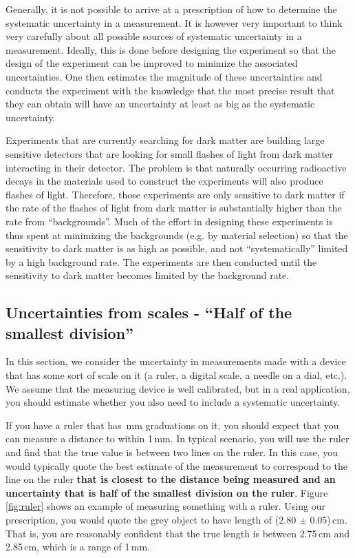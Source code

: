 Generally, it is not possible to arrive at a prescription of how to determine the systematic uncertainty in a measurement. It is however very important to think very carefully about all possible sources of systematic uncertainty in a measurement. Ideally, this is done before designing the experiment so that the design of the experiment can be improved to minimize the associated uncertainties. One then estimates the magnitude of these uncertainties and conducts the experiment with the knowledge that the most precise result that they can obtain will have an uncertainty at least as big as the systematic uncertainty.

Experiments that are currently searching for dark matter are building large sensitive detectors that are looking for small flashes of light from dark matter interacting in their detector. The problem is that naturally occurring radioactive decays in the materials used to construct the experiments will also produce flashes of light. Therefore, those experiments are only sensitive to dark matter if the rate of the flashes of light from dark matter is substantially higher than the rate from ``backgrounds''. Much of the effort in designing these experiments is thus spent at minimizing the backgrounds (e.g. by material selection) so that the sensitivity to dark matter is as high as possible, and not ``systematically'' limited by a high background rate. The experiments are then conducted until the sensitivity to dark matter becomes limited by the background rate.


\subsection{Uncertainties from scales - ``Half of the smallest division''}
In this section, we consider the uncertainty in measurements made with a device that has some sort of scale on it (a ruler, a digital scale, a needle on a dial, etc.). We assume that the measuring device is well calibrated, but in a real application, you should estimate whether you also need to include a systematic uncertainty. 

If you have a ruler that has \,mm graduations on it, you should expect that you can measure a distance to within 1\,mm. In typical scenario, you will use the ruler and find that the true value is between two lines on the ruler. In this case, you would typically quote the best estimate of the measurement to correspond to the line on the ruler \textbf{that is closest to the distance being measured and an uncertainty that is half of the smallest division on the ruler}. Figure \ref{fig:ruler} shows an example of measuring something with a ruler. Using our prescription, you would quote the grey object to have length of (2.80 $\pm$ 0.05)\,cm. That is, you are reasonably confident that the true length is between 2.75\,cm and 2.85\,cm, which is a range of 1\,mm. 

